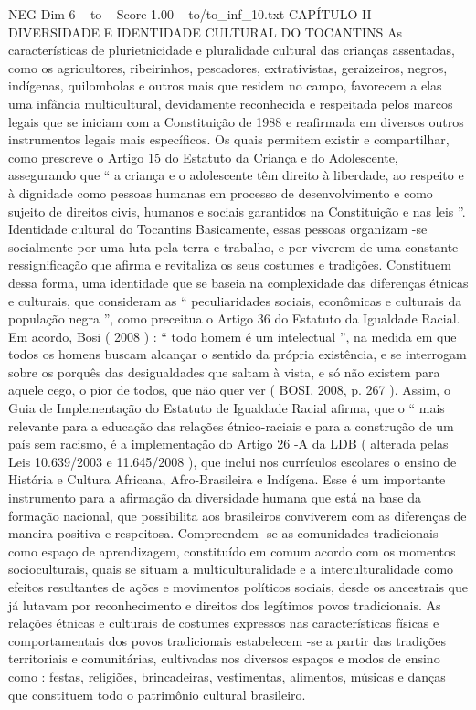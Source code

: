 \begin{textsample}{NEG Dim 6 – to – Score 1.00 – to/to\_inf\_10.txt}  \label{ex:f6_neg_113}
CAPÍTULO II - DIVERSIDADE E IDENTIDADE CULTURAL DO TOCANTINS As características de plurietnicidade e pluralidade cultural das crianças assentadas, como os agricultores, ribeirinhos, pescadores, extrativistas, geraizeiros, negros, indígenas, quilombolas e outros mais que residem no campo, favorecem a elas uma infância multicultural, devidamente reconhecida e respeitada pelos marcos legais que se iniciam com a Constituição de 1988 e reafirmada em diversos outros instrumentos legais mais específicos.
Os quais permitem existir e compartilhar, como prescreve o Artigo 15 do Estatuto da Criança e do Adolescente, assegurando que “ a criança e o adolescente têm direito à liberdade, ao respeito e à dignidade como pessoas humanas em processo de desenvolvimento e como sujeito de direitos civis, humanos e sociais garantidos na Constituição e nas leis ”.
Identidade cultural do Tocantins Basicamente, essas pessoas organizam -se socialmente por uma luta pela terra e trabalho, e por viverem de uma constante ressignificação que afirma e revitaliza os seus costumes e tradições.
Constituem dessa forma, uma identidade que se baseia na complexidade das diferenças étnicas e culturais, que consideram as “ peculiaridades sociais, econômicas e culturais da população negra ”, como preceitua o Artigo 36 do Estatuto da Igualdade Racial.
Em acordo, Bosi ( 2008 ) : “ todo homem é um intelectual ”, na medida em que todos os homens buscam alcançar o sentido da própria existência, e se interrogam sobre os porquês das desigualdades que saltam à vista, e só não existem para aquele cego, o pior de todos, que não quer ver ( BOSI, 2008, p. 267 ).
Assim, o Guia de Implementação do Estatuto de Igualdade Racial afirma, que o “ mais relevante para a educação das relações étnico-raciais e para a construção de um país sem racismo, é a implementação do Artigo 26 -A da LDB ( alterada pelas Leis 10.639/2003 e 11.645/2008 ), que inclui nos currículos escolares o ensino de História e Cultura Africana, Afro-Brasileira e Indígena.
Esse é um importante instrumento para a afirmação da diversidade humana que está na base da formação nacional, que possibilita aos brasileiros conviverem com as diferenças de maneira positiva e respeitosa.
Compreendem -se as comunidades tradicionais como espaço de aprendizagem, constituído em comum acordo com os momentos socioculturais, quais se situam a multiculturalidade e a interculturalidade como efeitos resultantes de ações e movimentos políticos sociais, desde os ancestrais que já lutavam por reconhecimento e direitos dos legítimos povos tradicionais.
As relações étnicas e culturais de costumes expressos nas características físicas e comportamentais dos povos tradicionais estabelecem -se a partir das tradições territoriais e comunitárias, cultivadas nos diversos espaços e modos de ensino como : festas, religiões, brincadeiras, vestimentas, alimentos, músicas e danças que constituem todo o patrimônio cultural brasileiro.

\end{textsample}
